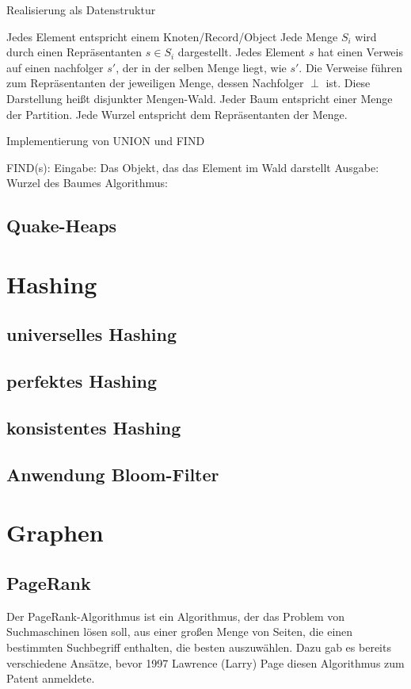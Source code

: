 Realisierung als Datenstruktur

Jedes Element entspricht einem Knoten/Record/Object
Jede Menge $S_i$ wird durch einen Repräsentanten $s \in S_i$ dargestellt.
Jedes Element $s$ hat einen Verweis auf einen nachfolger $s'$, der in der selben
Menge liegt, wie $s'$. Die Verweise führen zum Repräsentanten der jeweiligen
Menge, dessen Nachfolger $\perp$ ist.
Diese Darstellung heißt disjunkter Mengen-Wald. Jeder Baum entspricht einer
Menge der Partition. Jede Wurzel entspricht dem Repräsentanten der Menge.

Implementierung von UNION und FIND

FIND(s): Eingabe: Das Objekt, das das Element im Wald darstellt
Ausgabe: Wurzel des Baumes
Algorithmus: 


\subsection{Quake-Heaps}


\section{Hashing}

\subsection{universelles Hashing}
\subsection{perfektes Hashing}
\subsection{konsistentes Hashing}
\subsection{Anwendung Bloom-Filter}


\section{Graphen}

\subsection{PageRank}

Der PageRank-Algorithmus ist ein
Algorithmus, der das Problem von Suchmaschinen lösen soll, aus einer großen Menge von Seiten, die einen bestimmten Suchbegriff
enthalten, die besten auszuwählen. Dazu gab es bereits verschiedene Ansätze,
bevor 1997 Lawrence (Larry) Page diesen
Algorithmus zum Patent anmeldete.

